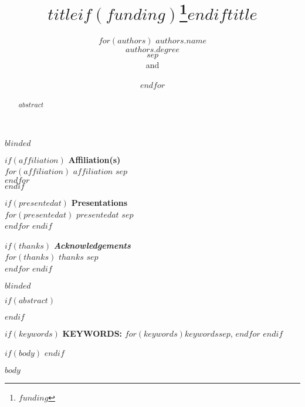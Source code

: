 \documentclass[11pt]{article}
\newcommand{\blind}{$blinded$}
\begin{document}
\def\spacingset#1{\renewcommand{\baselinestretch}%
{#1}\small\normalsize} \spacingset{1}


\date{\vspace{-5ex}}

\blind
{
  \title{\bf $title$$if(funding)$\thanks{$funding$}$endif$}

  \author{
    $for(authors)$
    $authors.name$\\ %
    $authors.degree$\\
    $sep$ \\ and \\\\ $endfor$
  }
  
  \maketitle
  \bigskip
  \begin{center}
  {
  
  $if(affiliation)$
  \textbf{Affiliation(s)}\\
  $for(affiliation)$ $affiliation$ $sep$\\\indent $endfor$\\
  \bigskip
  $endif$
  
  $if(presentedat)$
  \textbf{Presentations}\\
  $for(presentedat)$ $presentedat$ $sep$\\\indent $endfor$
  \bigskip
  $endif$
  
  $if(thanks)$
  \textit{\textbf{Acknowledgements}}\\
  $for(thanks)$ $thanks$ $sep$\vspace{.5em}\\ $endfor$
  $endif$
  }
  \end{center}

} \fi

\blind
{
  \title{\LARGE\bf $title$}
  \author{}
  \maketitle
  
  $if(abstract)$
  \bigskip
  \begin{abstract}
  $abstract$
  \end{abstract}
  $endif$
  \bigskip
  
  $if(keywords)$
  \noindent%
  {\bf KEYWORDS:} $for(keywords)$$keywords$$sep$, $endfor$
  \vfill
  $endif$
  
} \fi

\spacingset{1.45} %
$if(body)$
\newpage
$endif$

$body$



\end{document}
